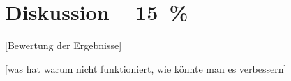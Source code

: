 \chapter{Diskussion -- 15~\%}

[Bewertung der Ergebnisse]

[was hat warum nicht funktioniert, wie könnte man es verbessern]
